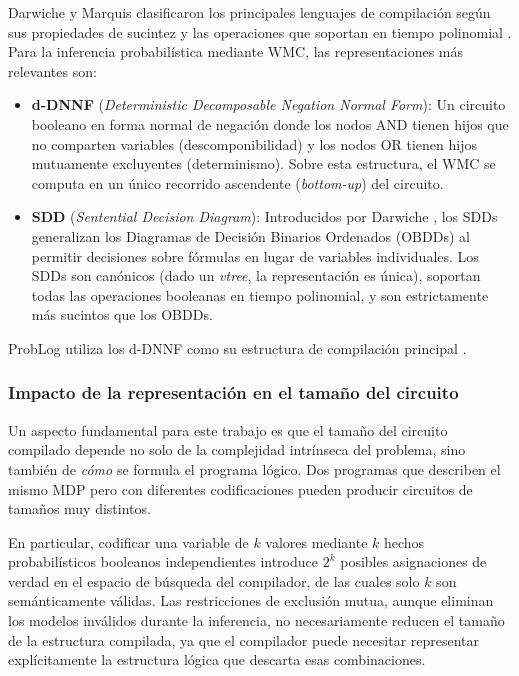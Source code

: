 Darwiche y Marquis clasificaron los principales lenguajes de compilación según sus propiedades de sucintez y las operaciones que soportan en tiempo polinomial \cite{darwiche2002knowledge}. Para la inferencia probabilística mediante WMC, las representaciones más relevantes son:

\begin{itemize}
    \item \textbf{d-DNNF} (\textit{Deterministic Decomposable Negation Normal Form}): Un circuito booleano en forma normal de negación donde los nodos AND tienen hijos que no comparten variables (descomponibilidad) y los nodos OR tienen hijos mutuamente excluyentes (determinismo). Sobre esta estructura, el WMC se computa en un único recorrido ascendente (\textit{bottom-up}) del circuito.

    \item \textbf{SDD} (\textit{Sentential Decision Diagram}): Introducidos por Darwiche \cite{darwiche2011sdd}, los SDDs generalizan los Diagramas de Decisión Binarios Ordenados (OBDDs) al permitir decisiones sobre fórmulas en lugar de variables individuales. Los SDDs son canónicos (dado un \textit{vtree}, la representación es única), soportan todas las operaciones booleanas en tiempo polinomial, y son estrictamente más sucintos que los OBDDs.
\end{itemize}

ProbLog utiliza los d-DNNF como su estructura de compilación principal \cite{vlasselaer2016problog2}.

\subsubsection{Impacto de la representación en el tamaño del circuito}

Un aspecto fundamental para este trabajo es que el tamaño del circuito compilado depende no solo de la complejidad intrínseca del problema, sino también de \textit{cómo} se formula el programa lógico. Dos programas que describen el mismo MDP pero con diferentes codificaciones pueden producir circuitos de tamaños muy distintos.

En particular, codificar una variable de $k$ valores mediante $k$ hechos probabilísticos booleanos independientes introduce $2^k$ posibles asignaciones de verdad en el espacio de búsqueda del compilador, de las cuales solo $k$ son semánticamente válidas. Las restricciones de exclusión mutua, aunque eliminan los modelos inválidos durante la inferencia, no necesariamente reducen el tamaño de la estructura compilada, ya que el compilador puede necesitar representar explícitamente la estructura lógica que descarta esas combinaciones.

